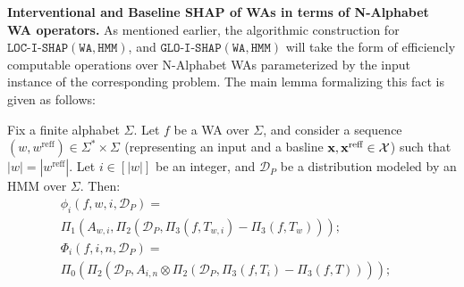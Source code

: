 \textbf{Interventional and Baseline SHAP of WAs in terms of N-Alphabet WA operators.}
As mentioned earlier, the algorithmic construction for $\texttt{LOC-I-SHAP}(\texttt{WA}, \texttt{HMM})$, and $\texttt{GLO-I-SHAP}(\texttt{WA}, \texttt{HMM})$ will take the form of efficiencly computable operations over N-Alphabet WAs parameterized by the input instance of the corresponding problem. The main lemma formalizing this fact is given as follows:
\begin{lemma} \label{lemma:shapasoperations}
Fix a finite alphabet $\Sigma$. Let $f$ be a WA over $\Sigma$, and consider a sequence $(w, w^{\text{reff}}) \in \Sigma^{*} \times \Sigma^{}$ (representing an input and a basline $\textbf{x}, \textbf{x}^{\text{reff}} \in \mathcal{X}$) such that $|w| = |w^{\text{reff}}|$. Let $i \in [|w|]$ be an integer, and $\mathcal{D}_P$ be a distribution modeled by an HMM over $\Sigma$. Then:
         {\small 
            \begin{align*}
         \phi_i
         (f,w,i,\mathcal{D}_P) = \quad\quad\quad\quad\quad\quad\quad\quad\quad\quad\quad\quad\quad\quad\quad\quad \\ \Pi_{1} (A_{w,i}, \Pi_{2}(\mathcal{D}_P, \Pi_{3}(f,T_{w,i}) 
          - \Pi_{3}(f,T_{w}) ) ); \quad\quad \\
            \Phi_i(f,i,n,\mathcal{D}_P) = \quad\quad\quad\quad\quad\quad\quad\quad\quad\quad\quad\quad\quad\quad\quad\quad \\ 
            \Pi_{0} ( \Pi_{2}(\mathcal{D}_P, A_{i,n} \otimes \Pi_{2}(\mathcal{D}_P, 
             \Pi_{3}(f,T_{i}) - \Pi_{3}(f,T)))); \quad\\

\end{align*}}
\end{lemma}
